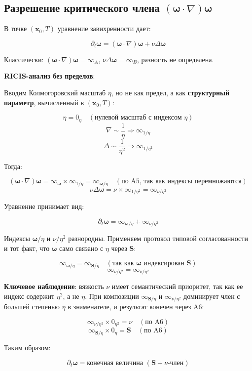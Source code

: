 \documentclass[12pt]{article}
\newcommand{\0}{\mathbf{0}}
\newcommand{\1}{\mathds{1}}
\newcommand{\bomega}{\bm{\omega}}
\newcommand{\bx}{\mathbf{x}}
\newcommand{\bS}{\mathbf{S}}
\begin{document}
\subsection{Разрешение критического члена $(\bomega\cdot\nabla)\bomega$}

В точке $(\bx_0,T)$ уравнение завихренности дает:

\[
\partial_t\bomega = (\bomega\cdot\nabla)\bomega + \nu\Delta\bomega
\]

Классически: $(\bomega\cdot\nabla)\bomega = \infty_A$, $\nu\Delta\bomega = \infty_B$, разность не определена.

\textbf{RICIS-анализ без пределов}:

Вводим Колмогоровский масштаб $\eta$, но не как предел, а как \textbf{структурный параметр}, вычисленный в $(\bx_0,T)$:

\[
\eta = 0_{\eta} \quad (\text{нулевой масштаб с индексом }\eta)
\]
\[
\nabla \sim \frac{1}{\eta} \Rightarrow \infty_{1/\eta}
\]
\[
\Delta \sim \frac{1}{\eta^2} \Rightarrow \infty_{1/\eta^2}
\]

Тогда:

\[
(\bomega\cdot\nabla)\bomega = \infty_{\bomega} \times \infty_{1/\eta} = \infty_{\bomega/\eta} \quad (\text{по A5, так как индексы перемножаются})
\]
\[
\nu\Delta\bomega = \nu \times \infty_{1/\eta^2} = \infty_{\nu/\eta^2}
\]

Уравнение принимает вид:

\[
\partial_t\bomega = \infty_{\bomega/\eta} + \infty_{\nu/\eta^2}
\]

Индексы $\bomega/\eta$ и $\nu/\eta^2$ разнородны. Применяем протокол типовой согласованности и тот факт, что $\bomega$ само связано с $\eta$ через $\bS$:

\[
\infty_{\bomega/\eta} = \infty_{\bS/\eta} \quad (\text{так как }\bomega\text{ индексирован }\bS)
\]
\[
\infty_{\nu/\eta^2} = \infty_{\nu/\eta^2}
\]

\textbf{Ключевое наблюдение}: вязкость $\nu$ имеет семантический приоритет, так как ее индекс содержит $\eta^2$, а не $\eta$. При композиции $\infty_{\bS/\eta}$ и $\infty_{\nu/\eta^2}$ доминирует член с большей степенью $\eta$ в знаменателе, и результат конечен через A6:

\[
\infty_{\nu/\eta^2} \times 0_{\eta^2} = \nu \quad (\text{по A6})
\]
\[
\infty_{\bS/\eta} \times 0_{\eta} = \bS \quad (\text{по A6})
\]

Таким образом:

\[
\partial_t\bomega = \text{конечная величина } (\bS + \nu\text{-член})
\]
\end{document}
